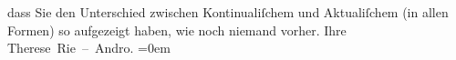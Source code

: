 \begin{ledgroupsized}[t]{13cm}
               dass Sie den Unterschied zwischen Kontinualiſchem und Aktualiſchem (in allen Formen)
               so aufgezeigt haben, wie noch niemand vorher.\pend
           \pstart
           Ihre{\\[\baselineskip]}\spacefill\mbox{Therese Rie – Andro.}\pend
           \leftskip=0em{}\endnumbering{}\end{ledgroupsized}  \newcommand{\dateiname}{L02577}\newcommand{\titel}{Therese Rie-Andro an Arthur Schnitzler, 6. 1. 1928}\newcommand{\editorInnen}{Martin Anton Müller und Gerd-Hermann Susen}
      